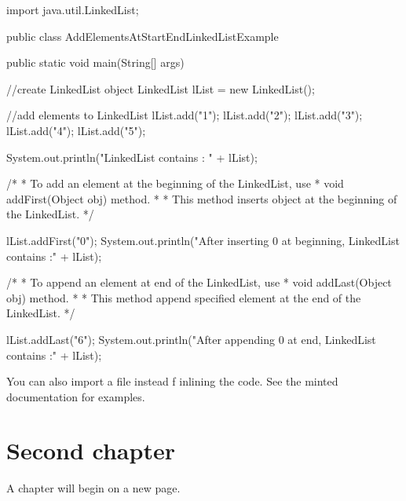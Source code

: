 \documentclass[a4paper,11pt]{report}
\begin{document}
\begin{javacode}
import java.util.LinkedList;
 
public class AddElementsAtStartEndLinkedListExample {
 
  public static void main(String[] args) {
 
    //create LinkedList object
    LinkedList lList = new LinkedList();
   
    //add elements to LinkedList
    lList.add("1");
    lList.add("2");
    lList.add("3");
    lList.add("4");
    lList.add("5");
   
    System.out.println("LinkedList contains : " + lList);
   
    /*
     * To add an element at the beginning of the LinkedList, use
     * void addFirst(Object obj) method.
     *
     * This method inserts object at the beginning of the LinkedList.
     */
   
     lList.addFirst("0");
     System.out.println("After inserting 0 at beginning, LinkedList contains :"
     + lList);
 
    /*
     * To append an element at end of the LinkedList, use
     * void addLast(Object obj) method.
     *
     * This method append specified element at the end of the LinkedList.
     */    
   
     lList.addLast("6");
     System.out.println("After appending 0 at end, LinkedList contains :" + lList);
 
  }
}
\end{javacode}

You can also import a file instead f inlining the code. See the minted documentation for examples.

\chapter{Second chapter}

A chapter will begin on a new page.

\blindtext
\end{document}

